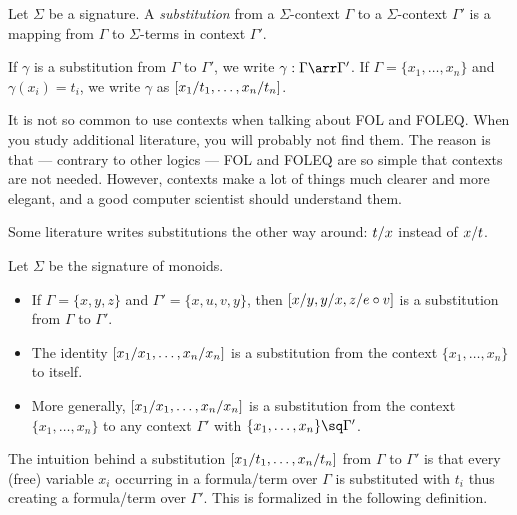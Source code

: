 \begin{definition}[Substitution]\label{def:fol:sub}
Let $\Sigma$ be a signature. A \emph{substitution} from a $\Sigma$-context $\Gamma$ to a $\Sigma$-context $\Gamma'$ is a mapping from $\Gamma$ to $\Sigma$-terms in context $\Gamma'$.
\end{definition}

\begin{notation}
If $\gamma$ is a substitution from $\Gamma$ to $\Gamma'$, we write $\gamma:\Gamma\arr\Gamma'$.
If $\Gamma=\{x_1,\ldots,x_n\}$ and $\gamma(x_i)=t_i$, we write $\gamma$ as $[x_1/t_1,\ldots,x_n/t_n]$.
\end{notation}

\begin{remark}[Contexts]
It is not so common to use contexts when talking about FOL and FOLEQ. When you study additional literature, you will probably not find them. The reason is that --- contrary to other logics --- FOL and FOLEQ are so simple that contexts are not needed. However, contexts make a lot of things much clearer and more elegant, and a good computer scientist should understand them.
\end{remark}

\begin{notation}
Some literature writes substitutions the other way around: $t/x$ instead of $x/t$.
\end{notation}

\begin{example}\label{ex:fol:sub}
Let $\Sigma$ be the signature of monoids.
\begin{itemize}
\item If $\Gamma=\{x,y,z\}$ and $\Gamma'=\{x,u,v,y\}$, then $[x/y,y/x,z/e\circ v]$ is a substitution from $\Gamma$ to $\Gamma'$.
\item The identity $[x_1/x_1,\ldots,x_n/x_n]$ is a substitution from the context $\{x_1,\ldots,x_n\}$ to itself.
\item More generally, $[x_1/x_1,\ldots,x_n/x_n]$ is a substitution from the context $\{x_1,\ldots,x_n\}$ to any context $\Gamma'$ with $\{x_1,\ldots,x_n\}\sq\Gamma'$.
\end{itemize}
\end{example}

The intuition behind a substitution $[x_1/t_1,\ldots,x_n/t_n]$ from $\Gamma$ to $\Gamma'$ is that every (free) variable $x_i$ occurring in a formula/term over $\Gamma$ is substituted with $t_i$ thus creating a formula/term over $\Gamma'$. This is formalized in the following definition.

